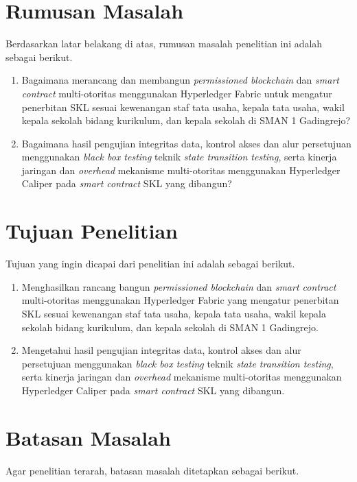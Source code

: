 \section{Rumusan Masalah} \label{I.Rumusan Masalah}
Berdasarkan latar belakang di atas, rumusan masalah penelitian ini adalah sebagai berikut.

\begin{enumerate}
    \item Bagaimana merancang dan membangun \textit{permissioned blockchain} dan \textit{smart contract} multi-otoritas menggunakan Hyperledger Fabric untuk mengatur penerbitan SKL sesuai kewenangan staf tata usaha, kepala tata usaha, wakil kepala sekolah bidang kurikulum, dan kepala sekolah di SMAN 1 Gadingrejo?
    \item Bagaimana hasil pengujian integritas data, kontrol akses dan alur persetujuan menggunakan \textit{black box testing} teknik \textit{state transition testing}, serta kinerja jaringan dan \textit{overhead} mekanisme multi-otoritas menggunakan Hyperledger Caliper pada \textit{smart contract} SKL yang dibangun?
\end{enumerate}

\section{Tujuan Penelitian} \label{I.Tujuan}
Tujuan yang ingin dicapai dari penelitian ini adalah sebagai berikut.

\begin{enumerate}
    \item Menghasilkan rancang bangun \textit{permissioned blockchain} dan \textit{smart contract} multi-otoritas menggunakan Hyperledger Fabric yang mengatur penerbitan SKL sesuai kewenangan staf tata usaha, kepala tata usaha, wakil kepala sekolah bidang kurikulum, dan kepala sekolah di SMAN 1 Gadingrejo.
    \item Mengetahui hasil pengujian integritas data, kontrol akses dan alur persetujuan menggunakan \textit{black box testing} teknik \textit{state transition testing}, serta kinerja jaringan dan \textit{overhead} mekanisme multi-otoritas menggunakan Hyperledger Caliper pada \textit{smart contract} SKL yang dibangun.
\end{enumerate}

\section{Batasan Masalah}
Agar penelitian terarah, batasan masalah ditetapkan sebagai berikut.

